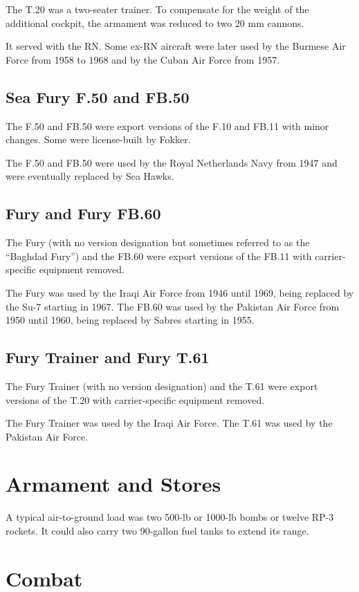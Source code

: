 The T.20 was a two-seater trainer. To compensate for the weight of the additional cockpit, the armament was reduced to two 20 mm cannons.

It served with the RN. Some ex-RN aircraft were later used by the Burmese Air Force from 1958 to 1968 and by the Cuban Air Force from 1957.

\subsection{Sea Fury F.50 and FB.50}

The F.50 and FB.50 were export versions of the F.10 and FB.11 with minor changes. Some were license-built by Fokker.

The F.50 and FB.50 were used by the Royal Netherlands Navy from 1947 and were eventually replaced by Sea Hawks.

\subsection{Fury and Fury FB.60}

The Fury (with no version designation but sometimes referred to as the “Baghdad Fury”) and the FB.60 were export versions of the FB.11 with carrier-specific equipment removed.

The Fury was used by the Iraqi Air Force from 1946 until 1969, being replaced by the Su-7 starting in 1967. The FB.60 was used by the Pakistan Air Force from 1950 until 1960, being replaced by Sabres starting in 1955.

\subsection{Fury Trainer and Fury T.61}

The Fury Trainer (with no version designation) and the T.61 were export versions of the T.20 with carrier-specific equipment removed.

The Fury Trainer was used by the Iraqi Air Force. The T.61 was used by the Pakistan Air Force.

\section{Armament and Stores}

A typical air-to-ground load was two 500-lb or 1000-lb bombs or twelve RP-3 rockets. It could also carry two 90-gallon fuel tanks to extend its range.

\section{Combat}

